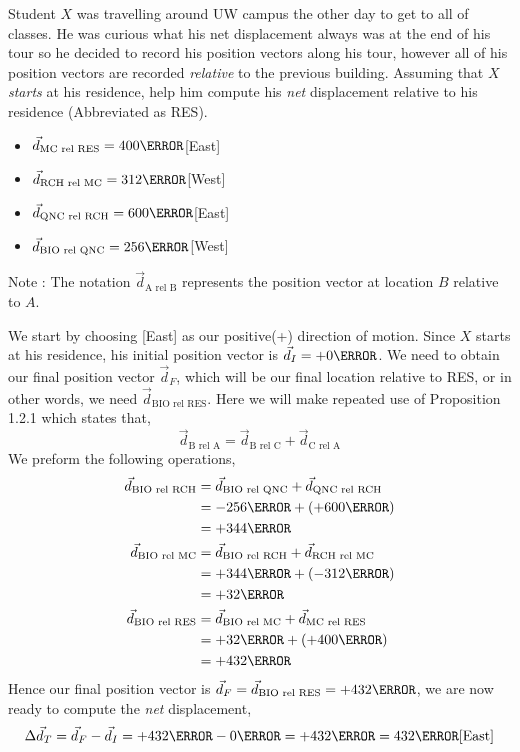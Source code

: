 \documentclass[12pt]{article} %
\newcommand{\tx}[1]{\text{#1}}
\begin{document}
\begin{qstn}[6]
Student $X$ was travelling around UW campus the other day to get to all of classes. He was curious what his net displacement always was at the end of his tour so he decided to record his position vectors along his tour, however all of his position vectors are recorded \emph{relative} to the previous building. Assuming that $X$ \emph{starts} at his residence, help him compute his \emph{net} displacement relative to his residence (Abbreviated as RES). 

\begin{itemize}
    \item $\vec d_{\tx{MC rel RES}} = 400\m$[East]
    \item $\vec d_{\tx{RCH rel MC}} = 312\m$[West]
    \item $\vec d_{\tx{QNC rel RCH}} = 600\m$[East]
    \item $\vec d_{\tx{BIO rel QNC}} = 256\m$[West]
\end{itemize}
Note : The notation $\vec d_{\tx{A rel B}}$ represents the position vector at location $B$ relative to $A$. 
\begin{soln}
    We start by choosing [East] as our positive(+) direction of motion. Since $X$ starts at his residence, his initial position vector is $\vec d_I = +0\m$. We need to obtain our final position vector $\vec d_F$, which will be our final location relative to RES, or in other words, we need $\vec d_{\tx{BIO rel RES}}$. Here we will make repeated use of Proposition 1.2.1 which states that, $$\vec d_{\tx{B rel A}} = \vec d_{\tx{B rel C}} + \vec d_{\tx{C rel A}}$$
    We preform the following operations,
    \begin{align*}
        \vec d_{\tx{BIO rel RCH}} &= \vec d_{\tx{BIO rel QNC}} + \vec d_{\tx{QNC rel RCH}}\\
        &= -256 \m + (+600\m)\\
        &= +344\m\\
        \vec d_{\tx{BIO rel MC}} &= \vec d_{\tx{BIO rel RCH}} + \vec d_{\tx{RCH rel MC}}\\
        &= +344\m + (-312\m)\\
        &= +32\m\\
        \vec d_{\tx{BIO rel RES}} &= \vec d_{\tx{BIO rel MC}} + \vec d_{\tx{MC rel RES}} \\
        &= +32\m + (+400\m)\\
        &= +432\m
    \end{align*}
    Hence our final position vector is $\vec d_F = \vec d_{\tx{BIO rel RES}} = +432\m$, we are now ready to compute the \emph{net} displacement,
    $$\Delta \vec d_T = \vec d_F - \vec d_I = +432 \m - 0\m = +432\m = 432\m\tx{[East]}$$
\end{soln}
    
\end{qstn}
\end{document}
